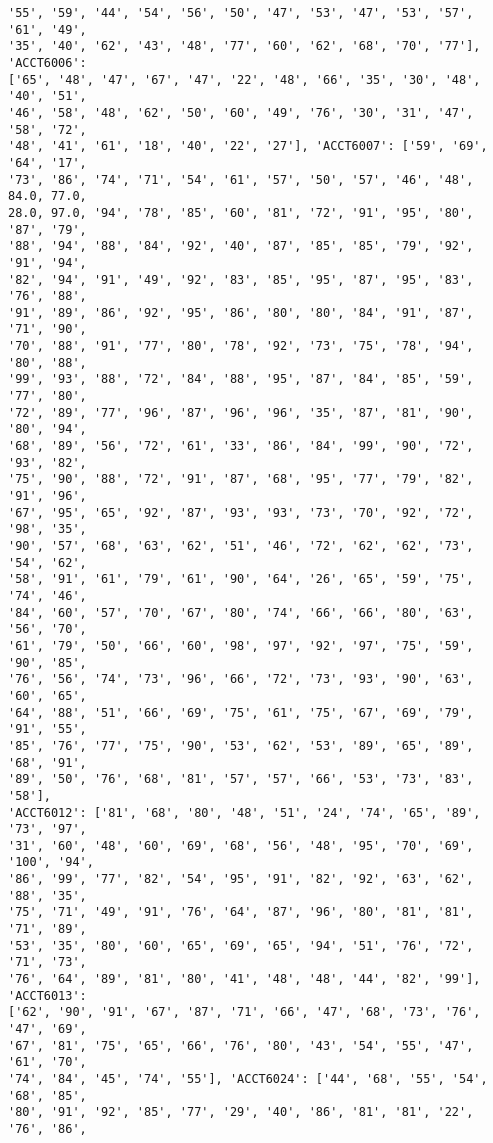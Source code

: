 \documentclass[11pt]{article}
\begin{document}
\begin{Verbatim}[commandchars=\\\{\}]
'55', '59', '44', '54', '56', '50', '47', '53', '47', '53', '57', '61', '49',
'35', '40', '62', '43', '48', '77', '60', '62', '68', '70', '77'], 'ACCT6006':
['65', '48', '47', '67', '47', '22', '48', '66', '35', '30', '48', '40', '51',
'46', '58', '48', '62', '50', '60', '49', '76', '30', '31', '47', '58', '72',
'48', '41', '61', '18', '40', '22', '27'], 'ACCT6007': ['59', '69', '64', '17',
'73', '86', '74', '71', '54', '61', '57', '50', '57', '46', '48', 84.0, 77.0,
28.0, 97.0, '94', '78', '85', '60', '81', '72', '91', '95', '80', '87', '79',
'88', '94', '88', '84', '92', '40', '87', '85', '85', '79', '92', '91', '94',
'82', '94', '91', '49', '92', '83', '85', '95', '87', '95', '83', '76', '88',
'91', '89', '86', '92', '95', '86', '80', '80', '84', '91', '87', '71', '90',
'70', '88', '91', '77', '80', '78', '92', '73', '75', '78', '94', '80', '88',
'99', '93', '88', '72', '84', '88', '95', '87', '84', '85', '59', '77', '80',
'72', '89', '77', '96', '87', '96', '96', '35', '87', '81', '90', '80', '94',
'68', '89', '56', '72', '61', '33', '86', '84', '99', '90', '72', '93', '82',
'75', '90', '88', '72', '91', '87', '68', '95', '77', '79', '82', '91', '96',
'67', '95', '65', '92', '87', '93', '93', '73', '70', '92', '72', '98', '35',
'90', '57', '68', '63', '62', '51', '46', '72', '62', '62', '73', '54', '62',
'58', '91', '61', '79', '61', '90', '64', '26', '65', '59', '75', '74', '46',
'84', '60', '57', '70', '67', '80', '74', '66', '66', '80', '63', '56', '70',
'61', '79', '50', '66', '60', '98', '97', '92', '97', '75', '59', '90', '85',
'76', '56', '74', '73', '96', '66', '72', '73', '93', '90', '63', '60', '65',
'64', '88', '51', '66', '69', '75', '61', '75', '67', '69', '79', '91', '55',
'85', '76', '77', '75', '90', '53', '62', '53', '89', '65', '89', '68', '91',
'89', '50', '76', '68', '81', '57', '57', '66', '53', '73', '83', '58'],
'ACCT6012': ['81', '68', '80', '48', '51', '24', '74', '65', '89', '73', '97',
'31', '60', '48', '60', '69', '68', '56', '48', '95', '70', '69', '100', '94',
'86', '99', '77', '82', '54', '95', '91', '82', '92', '63', '62', '88', '35',
'75', '71', '49', '91', '76', '64', '87', '96', '80', '81', '81', '71', '89',
'53', '35', '80', '60', '65', '69', '65', '94', '51', '76', '72', '71', '73',
'76', '64', '89', '81', '80', '41', '48', '48', '44', '82', '99'], 'ACCT6013':
['62', '90', '91', '67', '87', '71', '66', '47', '68', '73', '76', '47', '69',
'67', '81', '75', '65', '66', '76', '80', '43', '54', '55', '47', '61', '70',
'74', '84', '45', '74', '55'], 'ACCT6024': ['44', '68', '55', '54', '68', '85',
'80', '91', '92', '85', '77', '29', '40', '86', '81', '81', '22', '76', '86',

\end{Verbatim}
\end{document}
